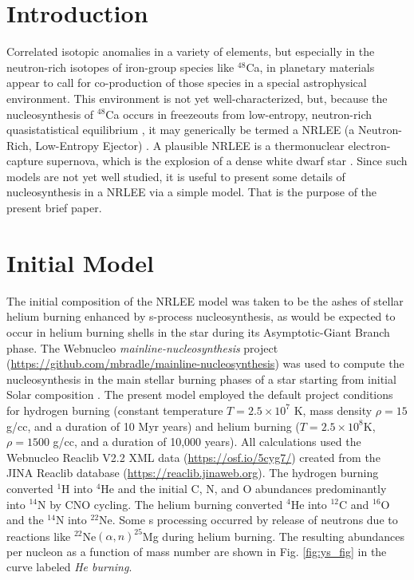 \documentclass[preprint]{revtex4-2}
\begin{document}
\section{Introduction}\label{sec:intro}

Correlated isotopic anomalies in a variety of elements, but especially
in the neutron-rich isotopes of iron-group species like $^{48}$Ca, in planetary
materials appear to call for co-production of those species in a special
astrophysical environment.  This environment is not yet well-characterized,
but, 
because the nucleosynthesis of $^{48}$Ca
occurs in freezeouts from low-entropy, neutron-rich quasistatistical equilibrium
\cite{1996ApJ...462..825M}, it may generically be termed a NRLEE
(a Neutron-Rich, Low-Entropy Ejector) \cite{Bermingham2021}.  A plausible
NRLEE is a thermonuclear electron-capture supernova, which is the explosion
of a dense white dwarf star \cite{2019A&A...622A..74J}.  Since such models
are not yet well studied, it is useful to present some details of
nucleosynthesis in a NRLEE via a simple model.  That is the purpose of the
present brief paper.

\section{Initial Model} \label{sec:initial}

The initial composition of the NRLEE model was taken to be the ashes of
stellar helium burning enhanced by s-process nucleosynthesis, as would be
expected to occur in helium burning shells in the star during its
Asymptotic-Giant Branch phase.  The Webnucleo {\it mainline-nucleosynthesis}
project (\url{https://github.com/mbradle/mainline-nucleosynthesis}) was
used to compute the nucleosynthesis in the main stellar burning phases of
a star starting from initial Solar composition \cite{2003ApJ...591.1220L}.
The present model employed the default project conditions for hydrogen burning
(constant temperature $T = 2.5\times 10^7$ K, mass density $\rho = 15$ g/cc,
and a duration of 10 Myr years) and helium burning
($T = 2.5\times 10^8$K, $\rho = 1500$ g/cc, and a duration of 10,000 years).
All calculations used the Webnucleo Reaclib V2.2 XML data
(\url{https://osf.io/5cyg7/}) created from the JINA Reaclib database
(\url{https://reaclib.jinaweb.org}).
The hydrogen burning converted $^1$H into $^4$He and the initial C, N, and O
abundances predominantly into $^{14}$N by CNO cycling.  The helium burning
converted $^4$He into $^{12}$C and $^{16}$O and the $^{14}$N into $^{22}$Ne.
Some s processing occurred by release of neutrons due to reactions like
$^{22}$Ne$(\alpha,n)^{25}$Mg during helium burning.  The resulting abundances
per nucleon as a function of mass number are shown in
Fig. \ref{fig:ys_fig} in the curve labeled {\it He burning}.
\end{document}
